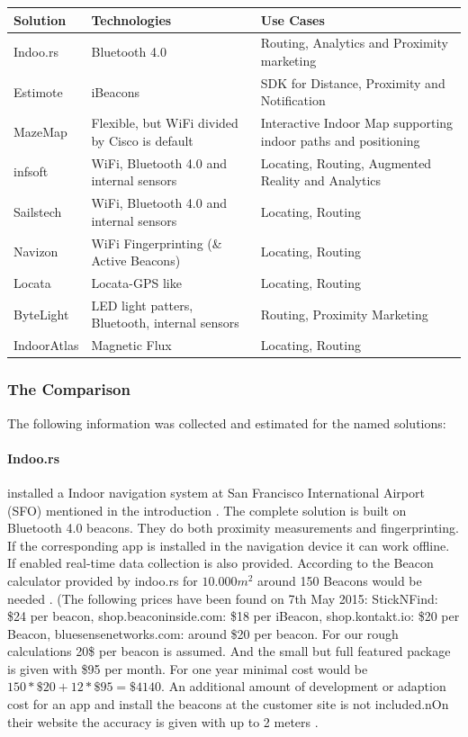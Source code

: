 \begin{singlespace}
\begin{tabularx}{14.65cm}{|p{2.5cm}|p{4cm}|p{6cm}|}\hline
	\textbf{Solution} & \textbf{Technologies} & \textbf{Use Cases}  \\ \hline
	Indoo.rs & Bluetooth 4.0  & Routing, Analytics and Proximity marketing \\ \hline
	Estimote & iBeacons & SDK for Distance, Proximity and Notification \\ \hline
	MazeMap & Flexible, but WiFi divided by Cisco is default & Interactive Indoor Map supporting indoor paths and positioning\\ \hline 
	infsoft & WiFi, Bluetooth 4.0 and internal sensors & Locating, Routing, Augmented Reality and Analytics \\ \hline
	Sailstech & WiFi, Bluetooth 4.0 and internal sensors & Locating, Routing \\ \hline
	Navizon & WiFi Fingerprinting (\& Active Beacons) & Locating, Routing \\ \hline
	Locata & Locata-GPS like & Locating, Routing \\ \hline
	ByteLight & LED light patters, Bluetooth, internal sensors & Routing, Proximity Marketing \\ \hline
	IndoorAtlas & Magnetic Flux & Locating, Routing \\ \hline
\end{tabularx}
\end{singlespace}

\subsubsection{The Comparison}
The following information was collected and estimated for the named solutions:

\paragraph{Indoo.rs} installed a Indoor navigation system at San Francisco International Airport (SFO) mentioned in the introduction \parencite{flySfo1}. The complete solution is built on Bluetooth 4.0 beacons. They do both proximity measurements and fingerprinting. If the corresponding app is installed in the navigation device it can work offline. If enabled real-time data collection is also provided. 
According to the Beacon calculator provided by indoo.rs for $10.000m^2$ around 150 Beacons would be needed \parencite{flySfo5}. (The following prices have been found on 7th May 2015: StickNFind: \$24 per beacon, shop.beaconinside.com: \$18 per iBeacon, shop.kontakt.io: \$20 per Beacon, bluesensenetworks.com: around \$20 per beacon. For our rough calculations 20\$ per beacon is assumed. And the small but full featured package is given with \$95 per month.
For one year minimal cost would be $150*\$20+12*\$95=\$4140$. An additional amount of development or adaption cost for an app and install the beacons at the customer site is not included.nOn their website the accuracy is given with up to 2 meters \parencite{flySfo5}.


